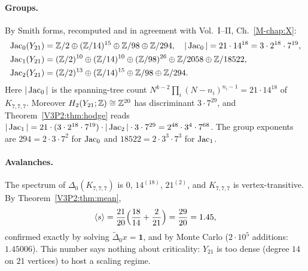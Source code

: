 \paragraph{Groups.} By Smith forms, recomputed and in agreement with
Vol.~I--II, Ch.~\ref{M-chap:X}:
\begin{align*}
\operatorname{Jac}_0(Y_{21})&=\mathbb{Z}/2\oplus(\mathbb{Z}/14)^{15}\oplus\mathbb{Z}/98\oplus\mathbb{Z}/294,\quad
|\operatorname{Jac}_0|=21\cdot14^{18}=3\cdot2^{18}\cdot7^{19},\\
\operatorname{Jac}_1(Y_{21})&=(\mathbb{Z}/2)^{10}\oplus(\mathbb{Z}/14)^{10}\oplus(\mathbb{Z}/98)^{26}\oplus\mathbb{Z}/2058\oplus\mathbb{Z}/18522,\\
\operatorname{Jac}_2(Y_{21})&=(\mathbb{Z}/2)^{13}\oplus(\mathbb{Z}/14)^{15}\oplus\mathbb{Z}/98\oplus\mathbb{Z}/294 .
\end{align*}
Here $|\operatorname{Jac}_0|$ is the spanning-tree count $N^{k-2}\prod_i(N-n_i)^{n_i-1}=21\cdot14^{18}$ of
$K_{7,7,7}$. Moreover $H_2(Y_{21};\mathbb{Z})\cong\mathbb{Z}^{20}$ has discriminant $3\cdot7^{29}$, and
Theorem~\ref{V3P2:thm:hodge} reads
$|\operatorname{Jac}_1|=21\cdot(3\cdot2^{18}\cdot7^{19})\cdot|\operatorname{Jac}_2|\cdot3\cdot7^{29}=2^{48}\cdot3^{4}\cdot7^{68}$.
The group exponents are $294=2\cdot3\cdot7^{2}$ for $\operatorname{Jac}_0$ and
$18522=2\cdot3^{3}\cdot7^{3}$ for $\operatorname{Jac}_1$.

\paragraph{Avalanches.} The spectrum of $\Delta_0(K_{7,7,7})$ is $0$, $14^{(18)}$, $21^{(2)}$,
and $K_{7,7,7}$ is vertex-transitive. By Theorem~\ref{V3P2:thm:mean},
\[
\langle s\rangle=\frac{21}{20}\Bigl(\frac{18}{14}+\frac{2}{21}\Bigr)=\frac{29}{20}=1.45 ,
\]
confirmed exactly by solving $\widetilde\Delta_0x=\mathbf 1$, and by Monte Carlo
($2\cdot10^{5}$ additions: $1.45006$). This number says nothing about criticality:
$Y_{21}$ is too dense (degree $14$ on $21$ vertices) to host a scaling regime.

